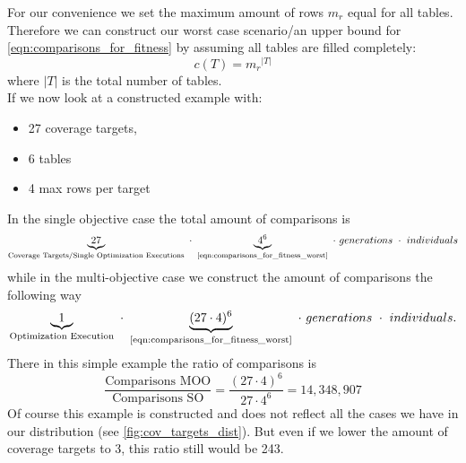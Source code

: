 For our convenience we set the maximum amount of rows $m_r$ equal for all tables. Therefore we can construct our worst case scenario/an upper bound for \cref{eqn:comparisons_for_fitness} by assuming all tables are filled completely:
\begin{equation}
	\label{eqn:comparisons_for_fitness_worst}
	c(T) = {m_r}^{|T|}
\end{equation} 
where $|T|$ is the total number of tables.\\
If we now look at a constructed example with:
\begin{itemize}
	\item 27 coverage targets,
	\item 6 tables
	\item 4 max rows per target
\end{itemize}
In the single objective case the total amount of comparisons is
\begin{equation}
	\underbrace{27}_{\textrm{Coverage Targets/Single Optimization Executions}} ~\cdot~ \underbrace{4^6}_{\textrm{\Cref{eqn:comparisons_for_fitness_worst}}} ~\cdot~ generations ~\cdot~ individuals
\end{equation}
while in the multi-objective case we construct the amount of comparisons the following way
\begin{equation}
	\underbrace{1}_{\textrm{Optimization Execution}} ~\cdot~ \underbrace{(27 \cdot 4)^6}_{\textrm{\Cref{eqn:comparisons_for_fitness_worst}}} ~\cdot~ generations ~\cdot~ individuals.
\end{equation}
There in this simple example the ratio of comparisons is
\begin{equation}
	\label{eqn:theoretical_ratio_row_comparisons}
	\frac{\textrm{Comparisons MOO}}{\textrm{Comparisons SO}} = \frac{(27 \cdot 4)^6}{27 \cdot 4^6} = 14,348,907
\end{equation}
Of course this example is constructed and does not reflect all the cases we have in our distribution (see \cref{fig:cov_targets_dist}). But even if we lower the amount of coverage targets to 3, this ratio still would be 243.

